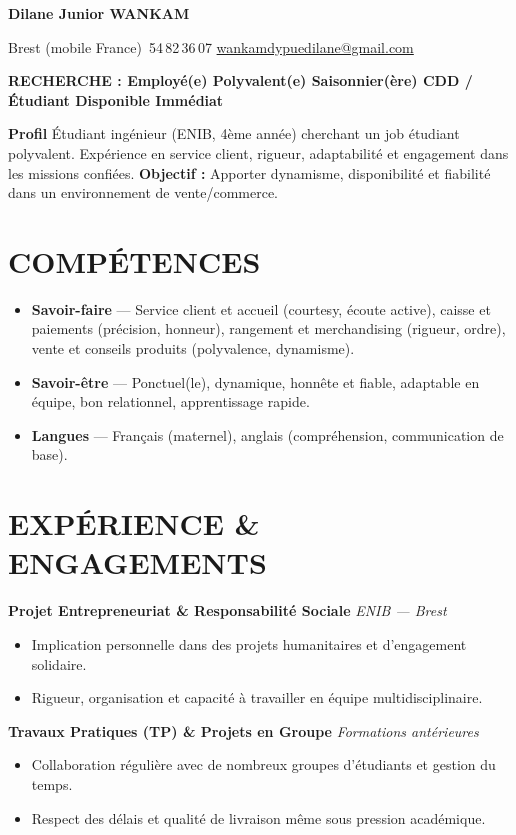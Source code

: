 \documentclass[10pt,a4paper]{article}
\newcommand{\cvheading}[1]{
  \vspace{0.2em}
  {\centering\colorbox{mainblue}{\parbox{0.97\linewidth}{\centering\color{white}\bfseries #1}}\par}
  \vspace{0.2em}
}
\begin{document}
{\centering
  {\LARGE\bfseries Dilane Junior WANKAM}\par
  \vspace{0.3em}
  \small
  Brest (mobile France)
  \;\textbullet{}\,54\,82\,36\,07
  \;\textbullet\;
  \href{mailto:wankamdypuedilane@gmail.com}{wankamdypuedilane@gmail.com}
  \par
}

\cvheading{RECHERCHE : Employé(e) Polyvalent(e) Saisonnier(ère) \quad \textbullet \quad CDD / Étudiant \quad \textbullet \quad Disponible Immédiat}

\textbf{Profil} Étudiant ingénieur (ENIB, 4ème année) cherchant un job étudiant polyvalent.
Expérience en service client, rigueur, adaptabilité et engagement dans les missions confiées.
\textbf{Objectif :} Apporter dynamisme, disponibilité et fiabilité dans un environnement de vente/commerce.

\section{COMPÉTENCES}
\begin{itemize}
  \item \textbf{Savoir-faire} --- Service client et accueil (courtesy, écoute active), caisse et paiements (précision, honneur), rangement et merchandising (rigueur, ordre), vente et conseils produits (polyvalence, dynamisme).
  \item \textbf{Savoir-être} --- Ponctuel(le), dynamique, honnête et fiable, adaptable en équipe, bon relationnel, apprentissage rapide.
  \item \textbf{Langues} --- Français (maternel), anglais (compréhension, communication de base).
\end{itemize}

\section{EXPÉRIENCE \& ENGAGEMENTS}

\textbf{Projet Entrepreneuriat \& Responsabilité Sociale} \hfill \textit{ENIB — Brest}
\begin{itemize}
  \item Implication personnelle dans des projets humanitaires et d'engagement solidaire.
  \item Rigueur, organisation et capacité à travailler en équipe multidisciplinaire.
\end{itemize}

\textbf{Travaux Pratiques (TP) \& Projets en Groupe} \hfill \textit{Formations antérieures}
\begin{itemize}
  \item Collaboration régulière avec de nombreux groupes d'étudiants et gestion du temps.
  \item Respect des délais et qualité de livraison même sous pression académique.
\end{itemize}
\end{document}
